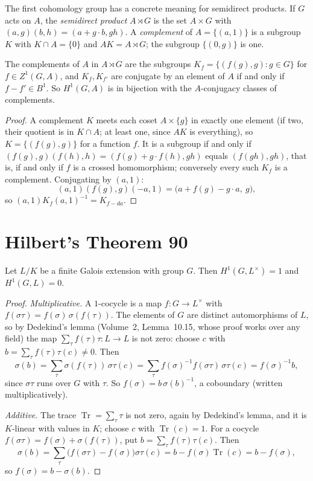 The first cohomology group has a concrete meaning for semidirect products. If $G$ acts on $A$, the \emph{semidirect product} $A\rtimes G$ is the set $A\times G$ with $(a,g)(b,h)=(a+g\cdot b,gh)$. A
\emph{complement} of $A=\{(a,1)\}$ is a subgroup $K$ with $K\cap A=\{0\}$ and $AK=A\rtimes G$; the subgroup $\{(0,g)\}$ is one.

\begin{proposition}\label{prop:complements}
The complements of $A$ in $A\rtimes G$ are the subgroups $K_f=\{(f(g),g):g\in G\}$ for $f\in Z^1(G,A)$, and $K_f,K_{f'}$ are conjugate by an element of $A$ if and only if $f-f'\in B^1$. So $H^1(G,A)$ is in bijection with the
$A$-conjugacy classes of complements.
\end{proposition}

\begin{proof}
A complement $K$ meets each coset $A\times\{g\}$ in exactly one element (if two, their quotient is in $K\cap A$; at least one, since $AK$ is everything), so $K=\{(f(g),g)\}$ for a function $f$. It is a subgroup if and only if
$(f(g),g)(f(h),h)=(f(g)+g\cdot f(h),gh)$ equals $(f(gh),gh)$, that is, if and only if $f$ is a crossed homomorphism; conversely every such $K_f$ is a complement. Conjugating by $(a,1)$:
\[
(a,1)(f(g),g)(-a,1)=\bigl(a+f(g)-g\cdot a,\ g\bigr),
\]
so $(a,1)K_f(a,1)^{-1}=K_{f-da}$.
\end{proof}

\section{Hilbert's Theorem 90}

\begin{theorem}\label{thm:hilbert90}
Let $L/K$ be a finite Galois extension with group $G$. Then $H^1(G,L^\times)=1$ and $H^1(G,L)=0$.
\end{theorem}

\begin{proof}
\emph{Multiplicative.} A $1$-cocycle is a map $f\colon G\to L^\times$ with $f(\sigma\tau)=f(\sigma)\,\sigma(f(\tau))$. The elements of $G$ are distinct automorphisms of $L$, so by Dedekind's lemma (Volume~2, Lemma~10.15, whose proof
works over any field) the map $\sum_{\tau}f(\tau)\tau\colon L\to L$ is not zero: choose $c$ with $b=\sum_\tau f(\tau)\tau(c)\ne0$. Then
\[
\sigma(b)=\sum_\tau\sigma(f(\tau))\,\sigma\tau(c)=\sum_\tau f(\sigma)^{-1}f(\sigma\tau)\,\sigma\tau(c)=f(\sigma)^{-1}b,
\]
since $\sigma\tau$ runs over $G$ with $\tau$. So $f(\sigma)=b\,\sigma(b)^{-1}$, a coboundary (written multiplicatively).

\emph{Additive.} The trace $\operatorname{Tr}=\sum_\tau\tau$ is not zero, again by Dedekind's lemma, and it is $K$-linear with values in $K$; choose $c$ with $\operatorname{Tr}(c)=1$. For a cocycle $f(\sigma\tau)=f(\sigma)+\sigma(f(\tau))$, put
$b=\sum_\tau f(\tau)\tau(c)$. Then
\[
\sigma(b)=\sum_\tau\bigl(f(\sigma\tau)-f(\sigma)\bigr)\sigma\tau(c)=b-f(\sigma)\operatorname{Tr}(c)=b-f(\sigma),
\]
so $f(\sigma)=b-\sigma(b)$.
\end{proof}

